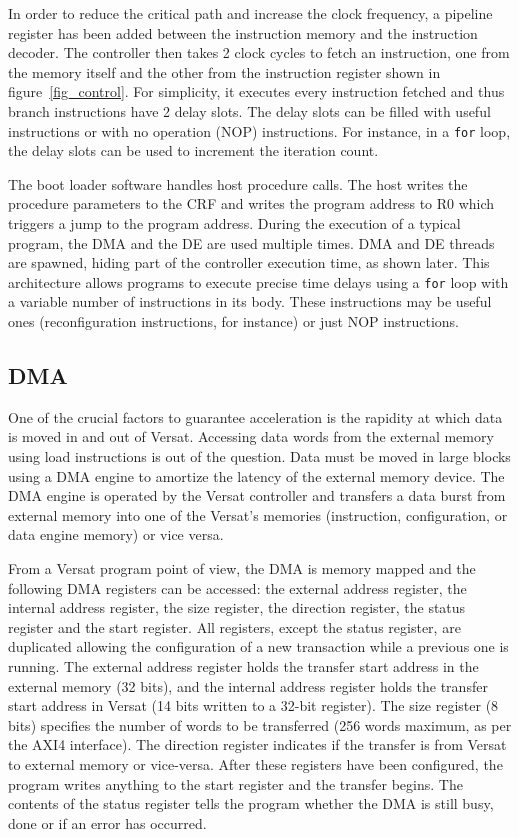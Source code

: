 \documentclass[journal]{IEEEtran}
\begin{document}
In order to reduce the critical path and increase the clock frequency,
a pipeline register has been added between the instruction memory and
the instruction decoder. The controller then takes 2 clock cycles to
fetch an instruction, one from the memory itself and the other from
the instruction register shown in figure~\ref{fig_control}. For
simplicity, it executes every instruction fetched and thus branch
instructions have 2 delay slots. The delay slots can be filled with
useful instructions or with no operation (NOP) instructions.  For
instance, in a {\tt for} loop, the delay slots can be used to
increment the iteration count.

The boot loader software handles host procedure calls. The host writes
the procedure parameters to the CRF and writes the program address to
R0 which triggers a jump to the program address. During the execution
of a typical program, the DMA and the DE are used multiple times. DMA
and DE threads are spawned, hiding part of the controller execution
time, as shown later. This architecture allows programs to execute
precise time delays using a {\tt for} loop with a variable number of
instructions in its body. These instructions may be useful ones
(reconfiguration instructions, for instance) or just NOP instructions.


\subsection{DMA}
\label{section:dma}

One of the crucial factors to guarantee acceleration is the rapidity
at which data is moved in and out of Versat. Accessing data words from
the external memory using load instructions is out of the
question. Data must be moved in large blocks using a DMA engine to
amortize the latency of the external memory device. The DMA engine is
operated by the Versat controller and transfers a data burst from
external memory into one of the Versat's memories (instruction,
configuration, or data engine memory) or vice versa.

From a Versat program point of view, the DMA is memory mapped and the
following DMA registers can be accessed: the external address
register, the internal address register, the size register, the
direction register, the status register and the start register. All
registers, except the status register, are duplicated allowing the
configuration of a new transaction while a previous one is
running. The external address register holds the transfer start
address in the external memory (32 bits), and the internal address
register holds the transfer start address in Versat (14 bits written
to a 32-bit register). The size register (8 bits) specifies the number
of words to be transferred (256 words maximum, as per the AXI4
interface). The direction register indicates if the transfer is from
Versat to external memory or vice-versa. After these registers have
been configured, the program writes anything to the start register and
the transfer begins. The contents of the status register tells the
program whether the DMA is still busy, done or if an error has
occurred.
\end{document}
